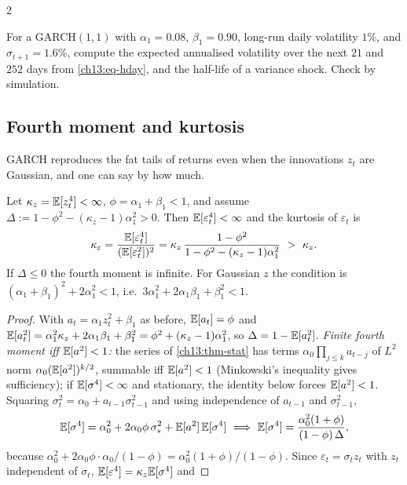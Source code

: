 \begin{paracol}{2}
\begin{exercise}\label{ch13:ex-extra1}
For a GARCH$(1,1)$ with $\alpha_1=0.08$, $\beta_1=0.90$, long-run daily volatility $1\%$, and $\sigma_{t+1}=1.6\%$, compute the expected annualised volatility over the next $21$ and $252$ days from \eqref{ch13:eq-hday}, and the half-life of a variance shock. Check by simulation.
\end{exercise}

\subsection{Fourth moment and kurtosis}\label{ch13:sec-kurt}
GARCH reproduces the fat tails of returns even when the innovations $z_t$ are Gaussian, and one can say by how much.
\begin{theorem}\label{ch13:thm-kurt}
Let $\kappa_z=\mathbb{E}[z_t^4]<\infty$, $\phi=\alpha_1+\beta_1<1$, and assume $\Delta:=1-\phi^2-(\kappa_z-1)\alpha_1^2>0$. Then $\mathbb{E}[\varepsilon_t^4]<\infty$ and the kurtosis of $\varepsilon_t$ is
\begin{equation}\label{ch13:eq-kurt}
  \kappa_\varepsilon=\frac{\E[\varepsilon_t^4]}{(\E[\varepsilon_t^2])^2}=\kappa_z\,\frac{1-\phi^2}{1-\phi^2-(\kappa_z-1)\alpha_1^2}\ >\ \kappa_z .
\end{equation}
If $\Delta\le0$ the fourth moment is infinite. For Gaussian $z$ the condition is $(\alpha_1+\beta_1)^2+2\alpha_1^2<1$, i.e.\ $3\alpha_1^2+2\alpha_1\beta_1+\beta_1^2<1$.
\end{theorem}
\begin{proof}
With $a_t=\alpha_1z_t^2+\beta_1$ as before, $\mathbb{E}[a_t]=\phi$ and $\mathbb{E}[a_t^2]=\alpha_1^2\kappa_z+2\alpha_1\beta_1+\beta_1^2=\phi^2+(\kappa_z-1)\alpha_1^2$, so $\Delta=1-\mathbb{E}[a_t^2]$.
\emph{Finite fourth moment iff $\mathbb{E}[a^2]<1$:} the series of \cref{ch13:thm-stat} has terms $\alpha_0\prod_{j\le k}a_{t-j}$ of $L^2$ norm $\alpha_0(\mathbb{E}[a^2])^{k/2}$, summable iff $\mathbb{E}[a^2]<1$ (Minkowski's inequality gives sufficiency);
if $\mathbb{E}[\sigma^4]<\infty$ and stationary, the identity below forces $\mathbb{E}[a^2]<1$.
Squaring $\sigma_t^2=\alpha_0+a_{t-1}\sigma_{t-1}^2$ and using independence of $a_{t-1}$ and $\sigma_{t-1}^2$,
\[
  \E[\sigma^4]=\alpha_0^2+2\alpha_0\phi\,\sigma_*^2+\E[a^2]\,\E[\sigma^4]\ \Longrightarrow\
  \E[\sigma^4]=\frac{\alpha_0^2(1+\phi)}{(1-\phi)\,\Delta},
\]
because $\alpha_0^2+2\alpha_0\phi\cdot\alpha_0/(1-\phi)=\alpha_0^2(1+\phi)/(1-\phi)$. Since $\varepsilon_t=\sigma_tz_t$ with $z_t$ independent of $\sigma_t$, $\mathbb{E}[\varepsilon^4]=\kappa_z\mathbb{E}[\sigma^4]$ and

\end{proof}
\end{paracol}
